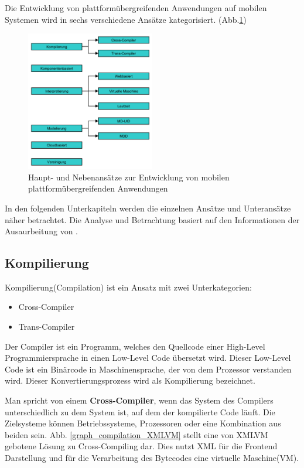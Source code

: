 \medskip
Die Entwicklung von plattformübergreifenden Anwendungen auf mobilen Systemen wird in sechs verschiedene Ansätze kategorisiert. (Abb.\ref{graph_cross_plattform_approaches})

\begin{figure}[htbp]
	\centering
	\includegraphics[width=0.5\textwidth]{Bilder/Cross_Plattform_Ansaetze}
	\caption{Haupt- und Nebenansätze zur Entwicklung von mobilen plattformübergreifenden Anwendungen}\label{graph_cross_plattform_approaches}
\end{figure}

In den folgenden Unterkapiteln werden die einzelnen Ansätze und Unteransätze näher betrachtet. Die Analyse und Betrachtung basiert auf den Informationen der Ausaurbeitung von \citep{cross_plattform_approaches}.

\subsection{Kompilierung}
Kompilierung(Compilation) ist ein Ansatz mit zwei Unterkategorien:

\begin{itemize}
	\item Cross-Compiler
	\item Trans-Compiler
\end{itemize}

Der Compiler ist ein Programm, welches den Quellcode einer High-Level Programmiersprache in einen Low-Level Code übersetzt wird. Dieser Low-Level Code ist ein Binärcode in Maschinensprache, der von dem Prozessor verstanden wird. Dieser Konvertierungsprozess wird als Kompilierung bezeichnet.

\medskip
Man spricht von einem \textbf{Cross-Compiler}, wenn das System des Compilers unterschiedlich zu dem System ist, auf dem der kompilierte Code läuft. Die Zielsysteme können Betriebssysteme, Prozessoren oder eine Kombination aus beiden sein. Abb. \ref{graph_compilation_XMLVM} stellt eine von XMLVM gebotene Lösung zu Cross-Compiling dar. Dies nutzt XML für die Frontend Darstellung und für die Verarbeitung des Bytecodes eine virtuelle Maschine(VM).

